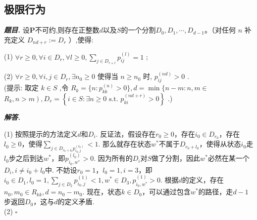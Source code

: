 \documentclass[10pt, a4paper, oneside]{ctexart}
\newenvironment{problem}{\begin{framed}\par\noindent\textbf{\textit{题目. }}}{\end{framed}\par}
\newenvironment{solution}{%
  \par\noindent\textbf{\textit{解答. }}\ignorespaces
}{%
  \hfill\ensuremath{\square}\par %
}
\begin{document}
\subsection{极限行为}
\begin{problem}设$\mathbf{P}$不可约,则存在正整数$d$以及$S$的一个分割${D}_{0},{D}_{1},\cdots,{D}_{d - 1}$。（对任何 $n$ 补充定义 ${{D}_{{nd} + r} \mathrel{\text{:=}} {D}_{r}}$ ）,使得:

(1) $\forall r \geq 0,\forall i \in {D}_{r},\forall l \geq 0,{\sum }_{j \in {D}_{r + l}}{p}_{ij}^{\left( l\right) } = 1$ ;

(2) $\forall r \geq 0,\forall i,j \in {D}_{r},\exists {n}_{0} \geq 0$ 使得当 $n \geq {n}_{0}$ 时, ${p}_{ij}^{\left( nd\right) } > 0$ .\\
(提示: 取定 \( k \in S \) ,令 \( {R}_{k} = \{ n : {p}_{kk}^{\left( n\right) } > 0\} ,d = \min \{ n - m : n,m \in \) \( \left. {{R}_{k},n > m}\right) ,{D}_{r} = \left\{ {i \in S : \exists n \geq 0\text{ s.t. }{p}_{ki}^{\left( nd + r\right) } > 0}\right\} \) .)
\end{problem}
\begin{solution}
(1) 按照提示的方法定义$d$和$D_i$. 反证法，假设存在$r_0\geq0$，存在$i_0\in D_{r_0}$，存在$l_0\geq 0$，使得$\sum_{j\in D_{r_0+l_0}p_{i_0,j}^{(l_0)}}<1$. 那么就存在状态$w^*$不属于$D_{r_0+l_0}$，使得从状态$i_0$走$l_0$步之后到达$w^*$，即$p_{i_0,w^*}^{(l_0)}>0$. 因为所有的$D_i$对$S$做了分割，因此$w^*$必然在某一个$D_i,i\neq i_0+l_0$中. 不妨设$r_0=1$，$l_0=1,i=3$，即$i_0\in D_1, l_0=1, \sum_{j\in D_2}p_{i_0,j}^{(1)}<1, w^*\in D_3,p_{i_0,w^*}^{(1)}>0$. 根据$d$的定义，存在$n_0,m_0\in R_{kk},d=n_0-m_0$. 现在，状态$k\in D_0$，可以通过包含$w^*$的路径，走$d-1$步返回$D_0$，这与$d$的定义矛盾.\\
(2) 
\end{solution}
\end{document}
